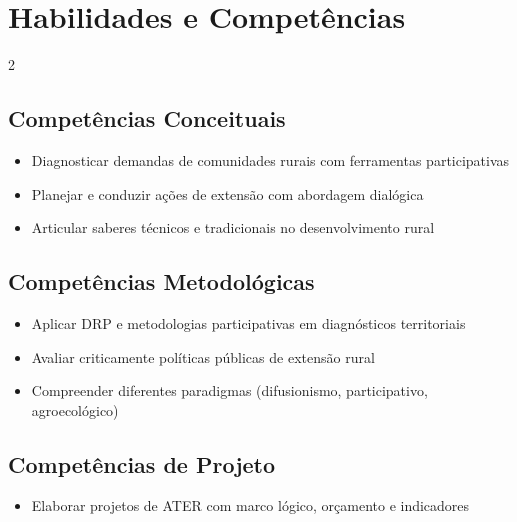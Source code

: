 \documentclass[11pt,a4paper]{article}
\begin{document}
\section*{Habilidades e Competências}

\begin{multicols}{2}

\subsection*{Competências Conceituais}

\begin{itemize}

\item Diagnosticar demandas de comunidades rurais com ferramentas participativas

\item Planejar e conduzir ações de extensão com abordagem dialógica

\item Articular saberes técnicos e tradicionais no desenvolvimento rural

\end{itemize}

\subsection*{Competências Metodológicas}

\begin{itemize}

\item Aplicar DRP e metodologias participativas em diagnósticos territoriais

\item Avaliar criticamente políticas públicas de extensão rural

\item Compreender diferentes paradigmas (difusionismo, participativo, agroecológico)

\end{itemize}

\columnbreak

\subsection*{Competências de Projeto}

\begin{itemize}

\item Elaborar projetos de ATER com marco lógico, orçamento e indicadores


\end{itemize}
\end{multicols}
\end{document}
